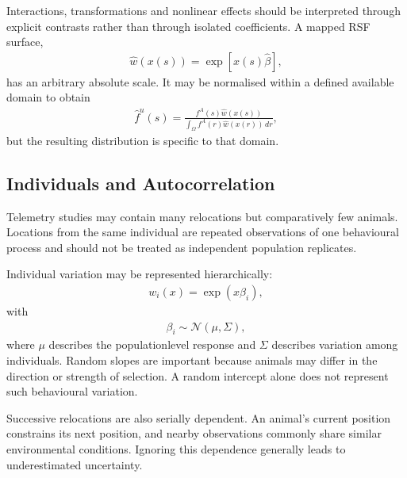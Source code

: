 \documentclass[letterpaper,10pt,english]{sphinxmanual}
\begin{document}
\sphinxAtStartPar
Interactions, transformations and nonlinear effects should be interpreted through explicit contrasts rather than through isolated coefficients. A mapped RSF surface,
\begin{equation*}
\begin{split}
\hat{w}\left(x(s)\right)
=
\exp\left[x(s)\hat{\beta}\right],
\end{split}
\end{equation*}
\sphinxAtStartPar
has an arbitrary absolute scale. It may be normalised within a defined available domain to obtain
\begin{equation*}
\begin{split}
\hat{f}^{u}(s)
=
\frac{
f^{A}(s)\hat{w}\left(x(s)\right)
}{
\displaystyle
\int_{\Omega}
f^{A}(r)\hat{w}\left(x(r)\right)\,dr
},
\end{split}
\end{equation*}
\sphinxAtStartPar
but the resulting distribution is specific to that domain.


\subsection{Individuals and Autocorrelation}
\label{\detokenize{theory:individuals-and-autocorrelation}}
\sphinxAtStartPar
Telemetry studies may contain many relocations but comparatively few animals. Locations from the same individual are repeated observations of one behavioural process and should not be treated as independent population replicates.

\sphinxAtStartPar
Individual variation may be represented hierarchically:
\begin{equation*}
\begin{split}
w_i(x)
=
\exp(x\beta_i),
\end{split}
\end{equation*}
\sphinxAtStartPar
with
\begin{equation*}
\begin{split}
\beta_i
\sim
\mathcal{N}(\mu,\Sigma),
\end{split}
\end{equation*}
\sphinxAtStartPar
where \(\mu\) describes the population\sphinxhyphen{}level response and \(\Sigma\) describes variation among individuals. Random slopes are important because animals may differ in the direction or strength of selection. A random intercept alone does not represent such behavioural variation.

\sphinxAtStartPar
Successive relocations are also serially dependent. An animal’s current position constrains its next position, and nearby observations commonly share similar environmental conditions. Ignoring this dependence generally leads to underestimated uncertainty.
\end{document}
